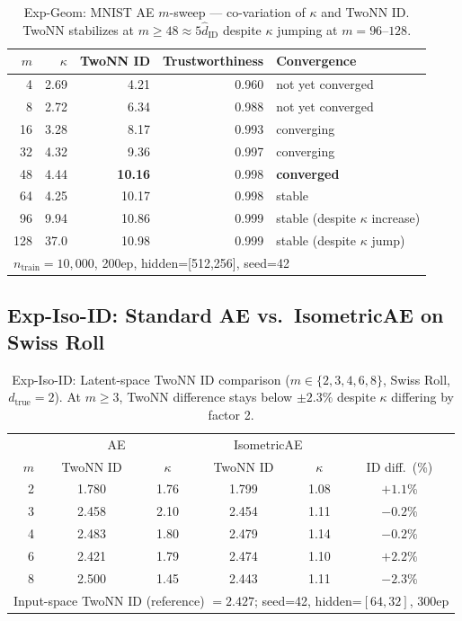 \documentclass[11pt,a4paper]{jsarticle}
\newcommand{\kap}{\kappa}
\begin{document}
\begin{table}[H]
\centering
\caption{Exp-Geom: MNIST AE $m$-sweep --- co-variation of $\kap$ and TwoNN ID. TwoNN stabilizes at $m \geq 48 \approx 5\hat{d}_\mathrm{ID}$ despite $\kap$ jumping at $m=96$--$128$.}
\label{tab:eq_mnist}
\small
\begin{tabular}{rrrrl}
\toprule
$m$ & $\kap$ & TwoNN ID & Trustworthiness & Convergence \\
\midrule
 4  & 2.69 & 4.21 & 0.960 & not yet converged \\
 8  & 2.72 & 6.34 & 0.988 & not yet converged \\
16  & 3.28 & 8.17 & 0.993 & converging \\
32  & 4.32 & 9.36 & 0.997 & converging \\
48  & 4.44 & \textbf{10.16} & 0.998 & \textbf{converged} \\
64  & 4.25 & 10.17 & 0.998 & stable \\
96  & 9.94 & 10.86 & 0.999 & stable (despite $\kap$ increase) \\
128 & 37.0 & 10.98 & 0.999 & stable (despite $\kap$ jump) \\
\midrule
\multicolumn{5}{l}{$n_\mathrm{train}=10{,}000$, 200ep, hidden=[512,256], seed=42} \\
\bottomrule
\end{tabular}
\end{table}

\subsection*{Exp-Iso-ID: Standard AE vs.\ IsometricAE on Swiss Roll}

\begin{table}[H]
\centering
\caption{Exp-Iso-ID: Latent-space TwoNN ID comparison ($m \in \{2,3,4,6,8\}$, Swiss Roll, $d_\mathrm{true}=2$). At $m \geq 3$, TwoNN difference stays below $\pm2.3\%$ despite $\kap$ differing by factor 2.}
\label{tab:iso_id}
\small
\begin{tabular}{r cc | cc | c}
\toprule
 & \multicolumn{2}{c|}{AE} & \multicolumn{2}{c|}{IsometricAE} & \\
$m$ & TwoNN ID & $\kap$ & TwoNN ID & $\kap$ & ID diff.\ (\%) \\
\midrule
2 & 1.780 & 1.76 & 1.799 & 1.08 & $+1.1\%$ \\
3 & 2.458 & 2.10 & 2.454 & 1.11 & $-0.2\%$ \\
4 & 2.483 & 1.80 & 2.479 & 1.14 & $-0.2\%$ \\
6 & 2.421 & 1.79 & 2.474 & 1.10 & $+2.2\%$ \\
8 & 2.500 & 1.45 & 2.443 & 1.11 & $-2.3\%$ \\
\midrule
\multicolumn{6}{l}{Input-space TwoNN ID (reference) $= 2.427$; seed=42, hidden=$[64,32]$, 300ep} \\
\bottomrule
\end{tabular}
\end{table}
\end{document}
